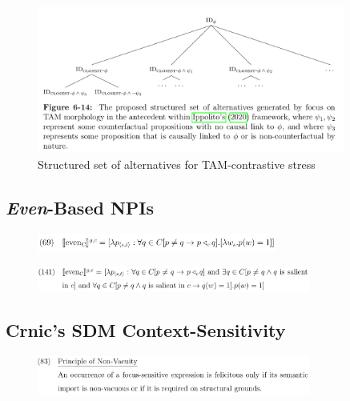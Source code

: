 \begin{frame}[t]
\subsectionpage\vskip 9pt\vfill
\begin{figure}
    \centering
    \includegraphics[trim=0 260 0 0,clip,width=0.9\textwidth]{graphics/ippolito-hybridtree.png}
    \caption{Structured set of alternatives for TAM-contrastive stress}
\end{figure}\vfill
\end{frame}

\subsection{\textit{Even}-Based NPIs}
\begin{frame}[t]
    \subsectionpage\vskip 9pt\vfill
\begin{figure}
    \centering
    \includegraphics[width=0.7\textwidth]{graphics/crnic-even.png}
\end{figure}\vfill
\end{frame}

\begin{frame}[t]
    \subsectionpage\vskip 9pt\vfill
\begin{figure}
    \centering
    \includegraphics[width=0.8\textwidth]{graphics/crnic-even-extended.png}
\end{figure}\vfill
\end{frame}

\subsection{Crnic's SDM Context-Sensitivity}
\begin{frame}[t]
    \subsectionpage\vskip 9pt\vfill
\begin{figure}
    \centering
    \includegraphics[width=0.8\textwidth]{graphics/crnic-nonvacuity.png}
\end{figure}\vfill
\end{frame}

